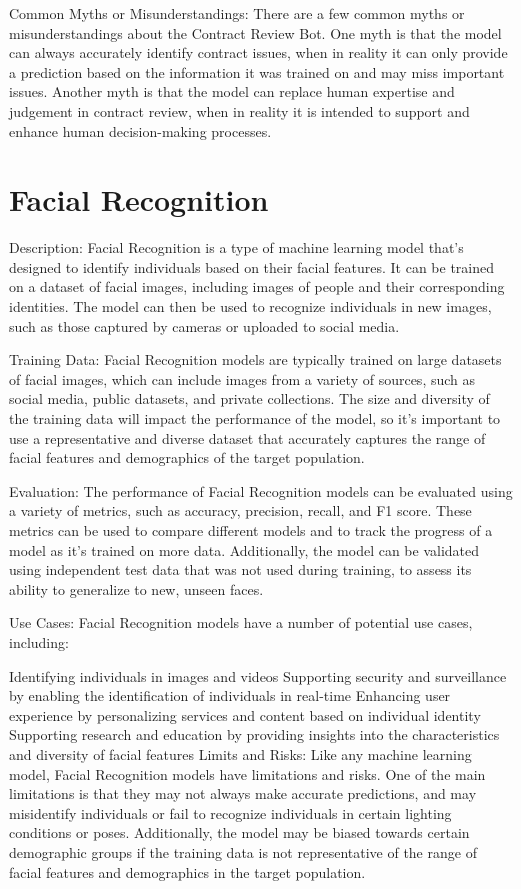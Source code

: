 Common Myths or Misunderstandings:
There are a few common myths or misunderstandings about the Contract Review Bot. One myth is that the model can always accurately identify contract issues, when in reality it can only provide a prediction based on the information it was trained on and may miss important issues. Another myth is that the model can replace human expertise and judgement in contract review, when in reality it is intended to support and enhance human decision-making processes.

\section{Facial Recognition}

Description:
Facial Recognition is a type of machine learning model that's designed to identify individuals based on their facial features. It can be trained on a dataset of facial images, including images of people and their corresponding identities. The model can then be used to recognize individuals in new images, such as those captured by cameras or uploaded to social media.

Training Data:
Facial Recognition models are typically trained on large datasets of facial images, which can include images from a variety of sources, such as social media, public datasets, and private collections. The size and diversity of the training data will impact the performance of the model, so it's important to use a representative and diverse dataset that accurately captures the range of facial features and demographics of the target population.

Evaluation:
The performance of Facial Recognition models can be evaluated using a variety of metrics, such as accuracy, precision, recall, and F1 score. These metrics can be used to compare different models and to track the progress of a model as it's trained on more data. Additionally, the model can be validated using independent test data that was not used during training, to assess its ability to generalize to new, unseen faces.

Use Cases:
Facial Recognition models have a number of potential use cases, including:

Identifying individuals in images and videos
Supporting security and surveillance by enabling the identification of individuals in real-time
Enhancing user experience by personalizing services and content based on individual identity
Supporting research and education by providing insights into the characteristics and diversity of facial features
Limits and Risks:
Like any machine learning model, Facial Recognition models have limitations and risks. One of the main limitations is that they may not always make accurate predictions, and may misidentify individuals or fail to recognize individuals in certain lighting conditions or poses. Additionally, the model may be biased towards certain demographic groups if the training data is not representative of the range of facial features and demographics in the target population.

